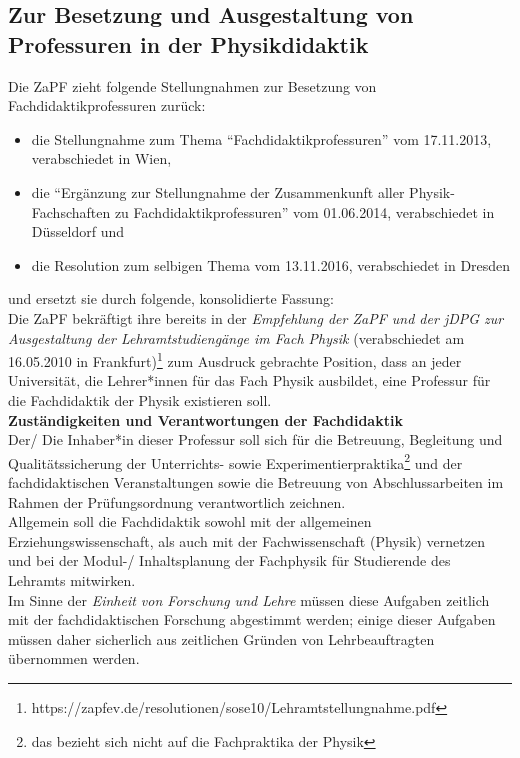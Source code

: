 
\subsection*{Zur Besetzung und Ausgestaltung von Professuren in der Physikdidaktik}
Die ZaPF zieht folgende Stellungnahmen zur Besetzung von Fachdidaktikprofessuren zurück:
\begin{itemize}
\item die Stellungnahme zum Thema "`Fachdidaktikprofessuren"' vom 17.11.2013, verabschiedet in Wien,
\item die "`Ergänzung zur Stellungnahme der Zusammenkunft aller Physik-Fachschaften zu Fachdidaktikprofessuren"' vom 01.06.2014, verabschiedet in Düsseldorf und
\item die Resolution zum selbigen Thema vom 13.11.2016, verabschiedet in Dresden
\end{itemize}
und ersetzt sie durch folgende, konsolidierte Fassung:
\vspace{0.5\baselineskip}\\
Die ZaPF bekräftigt ihre bereits in der \textit{Empfehlung der ZaPF und der jDPG zur Ausgestaltung der Lehramtstudiengänge im Fach Physik}
(verabschiedet am 16.05.2010 in Frankfurt)\footnote{https://zapfev.de/resolutionen/sose10/Lehramtstellungnahme.pdf} zum Ausdruck gebrachte Position, dass an jeder Universität, die Lehrer*innen für das Fach Physik ausbildet, eine Professur für die Fachdidaktik der Physik existieren soll.
\vspace{0.5\baselineskip}\\
\textbf{Zuständigkeiten und Verantwortungen der Fachdidaktik}\\
Der/ Die Inhaber*in dieser Professur soll sich für die Betreuung, Begleitung und Qualitäts\-sicherung der Unterrichts- sowie Experimentierpraktika\footnote{das bezieht sich nicht auf die Fachpraktika der Physik} und der fachdidaktischen Veranstaltungen sowie die  Betreuung von Abschlussarbeiten im Rahmen der Prüfungsordnung verantwortlich zeichnen.\\
Allgemein soll die Fachdidaktik sowohl mit der allgemeinen Erziehungswissenschaft, als auch mit der Fachwissenschaft (Physik) vernetzen und bei der Modul-/ Inhaltsplanung der Fachphysik für Studierende des Lehramts mitwirken.\\\newpage
Im Sinne der \textit{Einheit von Forschung und Lehre} müssen diese Aufgaben zeitlich mit der fachdidaktischen Forschung abgestimmt werden; einige dieser Aufgaben müssen daher sicherlich aus zeitlichen Gründen von Lehrbeauftragten übernommen werden.
